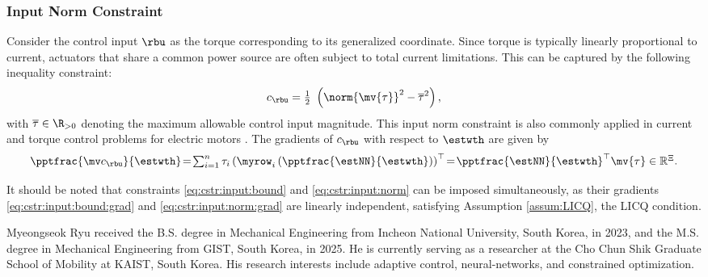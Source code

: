 \documentclass[journal]{IEEEtran}
\newcommand*{\template}{template}
\begin{document}
\subsubsection{Input Norm Constraint}\label{sec:appen:cstr:input:norm}

Consider the control input $\rbu$ as the torque corresponding to its generalized coordinate. 
Since torque is typically linearly proportional to current, actuators that share a common power source are often subject to total current limitations. This can be captured by the following inequality constraint: 
\begin{equation}
    c_{\rbu}
    =
    \tfrac{1}{2}\
    \left(
        \norm{
        \mv{\tau}
        }^2 
        -
        \overline\tau^2
    \right)
    ,
    \label{eq:cstr:input:norm}
\end{equation}
with $\overline\tau\in\R_{>0}$ denoting the maximum allowable control input magnitude. This input norm constraint is also commonly applied in current and torque control problems for electric motors \cite{Choi:2024aa}.
The gradients of $c_{\rbu}$ with respect to $\estwth$ are given by
\begin{equation}
    \pptfrac{\mv c_{\rbu}}{\estwth}
    \!=\! 
    \textstyle\sum_{i=1}^n \tau_{i} 
    \left(
        \myrow_i
        \left(
            \pptfrac{\estNN}{\estwth}
        \right)
    \right)^\top  
    \!=\! 
    {\pptfrac{\estNN}{\estwth}}^\top
    \mv{\tau}
    \in \mathbb R^{\Xi}.
    \label{eq:cstr:input:norm:grad}
\end{equation}

\hfill

It should be noted that constraints \eqref{eq:cstr:input:bound} and \eqref{eq:cstr:input:norm} can be imposed simultaneously, as their gradients \eqref{eq:cstr:input:bound:grad} and \eqref{eq:cstr:input:norm:grad} are linearly independent, satisfying Assumption \ref{assum:LICQ}, \ie the LICQ condition.




\begin{IEEEbiography}{Myeongseok Ryu}
    received the B.S. degree in Mechanical Engineering from Incheon National University, South Korea, in 2023, and the M.S. degree in Mechanical Engineering from GIST, South Korea, in 2025. 
    He is currently serving as a researcher at the Cho Chun Shik Graduate School of Mobility at KAIST, South Korea.
    His research interests include adaptive control, neural-networks, and constrained optimization.
\end{IEEEbiography}
\end{document}
